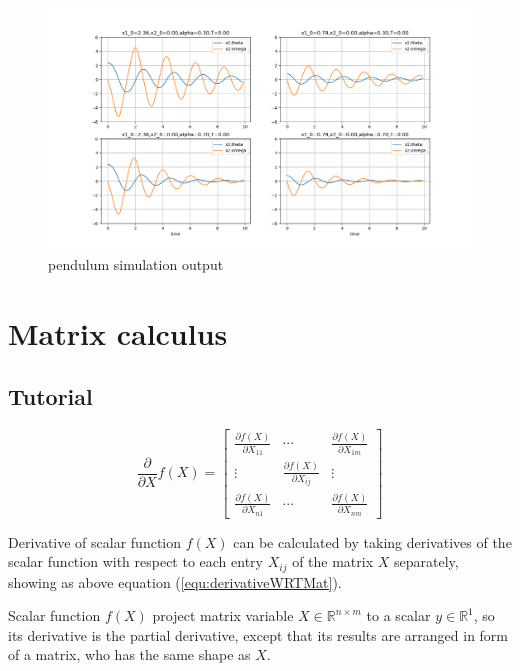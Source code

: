 \documentclass{article}
\begin{document}
\begin{figure}[htbp]
    \centering
    \includegraphics[width=\textwidth]{img/pendulum_sim.png}
    \caption{pendulum simulation output}
    \label{fig:pendulum_sim}
\end{figure}

\section{Matrix calculus}

\subsection{Tutorial}

\begin{equation}
    \frac{\partial}{\partial X}f(X) = 
    \begin{bmatrix}
        \frac{\partial f(X)}{\partial X_{11}} & \cdots & \frac{\partial f(X)}{\partial X_{1m}} \\
        \vdots & \frac{\partial f(X)}{\partial X_{ij}} & \vdots \\
        \frac{\partial f(X)}{\partial X_{n1}} & \cdots & \frac{\partial f(X)}{\partial X_{nm}}
    \end{bmatrix}
    \label{equ:derivativeWRTMat}
\end{equation}

Derivative of scalar function $f(X)$ can be calculated 
by taking derivatives of the scalar function with respect to 
each entry $X_{ij}$ of the matrix $X$ separately, showing 
as above equation (\ref{equ:derivativeWRTMat}). 

Scalar function $f(X)$ project matrix variable 
$X\in\mathbb{R}^{n\times m}$ to a scalar $y\in\mathbb{R}^{1}$,
so its derivative is the partial derivative, except that 
its results are arranged in form of a matrix, who has the same shape as $X$.
\end{document}

